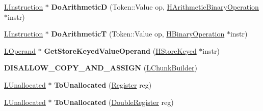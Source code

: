 \begin{DoxyCompactItemize}
\item 
\hyperlink{classv8_1_1internal_1_1_l_instruction}{L\+Instruction} $\ast$ {\bfseries Do\+ArithmeticD} (Token\+::\+Value op, \hyperlink{classv8_1_1internal_1_1_h_arithmetic_binary_operation}{H\+Arithmetic\+Binary\+Operation} $\ast$instr)\hypertarget{classv8_1_1internal_1_1_l_chunk_builder_a9b447e818699e4928b4f769ae6b7ecbd}{}\label{classv8_1_1internal_1_1_l_chunk_builder_a9b447e818699e4928b4f769ae6b7ecbd}

\item 
\hyperlink{classv8_1_1internal_1_1_l_instruction}{L\+Instruction} $\ast$ {\bfseries Do\+ArithmeticT} (Token\+::\+Value op, \hyperlink{classv8_1_1internal_1_1_h_binary_operation}{H\+Binary\+Operation} $\ast$instr)\hypertarget{classv8_1_1internal_1_1_l_chunk_builder_aba09d1f1c27b568c058b1d54bb250d12}{}\label{classv8_1_1internal_1_1_l_chunk_builder_aba09d1f1c27b568c058b1d54bb250d12}

\item 
\hyperlink{classv8_1_1internal_1_1_l_operand}{L\+Operand} $\ast$ {\bfseries Get\+Store\+Keyed\+Value\+Operand} (\hyperlink{classv8_1_1internal_1_1_h_store_keyed}{H\+Store\+Keyed} $\ast$instr)\hypertarget{classv8_1_1internal_1_1_l_chunk_builder_a77dd3c3e1f81e523449bf51724513463}{}\label{classv8_1_1internal_1_1_l_chunk_builder_a77dd3c3e1f81e523449bf51724513463}

\item 
{\bfseries D\+I\+S\+A\+L\+L\+O\+W\+\_\+\+C\+O\+P\+Y\+\_\+\+A\+N\+D\+\_\+\+A\+S\+S\+I\+GN} (\hyperlink{classv8_1_1internal_1_1_l_chunk_builder}{L\+Chunk\+Builder})\hypertarget{classv8_1_1internal_1_1_l_chunk_builder_a19b07322023329077a9f8c29451592b5}{}\label{classv8_1_1internal_1_1_l_chunk_builder_a19b07322023329077a9f8c29451592b5}

\item 
\hyperlink{classv8_1_1internal_1_1_l_unallocated}{L\+Unallocated} $\ast$ {\bfseries To\+Unallocated} (\hyperlink{structv8_1_1internal_1_1_register}{Register} reg)\hypertarget{classv8_1_1internal_1_1_l_chunk_builder_ae996944c8e59f0e19fe2743090135cb9}{}\label{classv8_1_1internal_1_1_l_chunk_builder_ae996944c8e59f0e19fe2743090135cb9}

\item 
\hyperlink{classv8_1_1internal_1_1_l_unallocated}{L\+Unallocated} $\ast$ {\bfseries To\+Unallocated} (\hyperlink{structv8_1_1internal_1_1_double_register}{Double\+Register} reg)\hypertarget{classv8_1_1internal_1_1_l_chunk_builder_a427a5c234ee24a3cf1c3036069908e31}{}\label{classv8_1_1internal_1_1_l_chunk_builder_a427a5c234ee24a3cf1c3036069908e31}


\end{DoxyCompactItemize}
